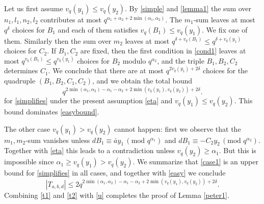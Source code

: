 \documentclass[11pt]{amsart}
\theoremstyle{plain}
\numberwithin{equation}{section}
\theoremstyle{definition}
\renewcommand{\geq}{\geqslant}
\renewcommand{\leq}{\leqslant}
\begin{document}
Let us first assume $v_q(y_1) \leq v_q(y_2)$. By \eqref{simple} and \eqref{lemma1} the sum over $n_1, l_1, n_2, l_2$ contributes at most $q^{\alpha_1 + \alpha_2 +  2 \min(\alpha_1, \alpha_2)}$. The $m_1$-sum leaves at most $q^{\delta}$ choices for $B_1$ and each of them satisfies $v_q(B_1) \leq v_q(y_1)$. We fix one of them.  Similarly then the sum over $m_2$ leaves at most $q^{\delta + v_q(B_1)} \leq q^{\delta + v_q(y_1)}$ choices for $C_2$. If $B_1, C_2$ are fixed, then the first condition in \eqref{cond1} leaves at most $q^{v_q(B_1)} \leq q^{v_q(y_1)}$  choices for $B_2$ modulo $q^{\alpha_2}$, and the triple $B_1, B_2, C_2$ determines $C_1$. We conclude that there are at most $q^{2v_q(y_1) + 2\delta}$ choices for the quadruple $(B_1, B_2,  C_1, C_2)$, and we obtain the total bound
\begin{equation}\label{case1}
  q^{2 \min(\alpha_1, \alpha_2) - \alpha_1- \alpha_2 + 2 \min(v_q(y_1), v_q(y_2)) + 2\delta} . 
\end{equation}
for \eqref{simplifies} under the present assumption \eqref{eta} and  $v_q(y_1) \leq v_q(y_2)$. This bound dominates \eqref{easybound}. 

The other case $v_q(y_1) > v_q(y_2)$ %
cannot happen: first we observe that the $m_1, m_2$-sum vanishes unless $dB_1 \equiv \bar{a}y_1 \, (\text{mod } q^{\alpha_1})$ and $dB_1 \equiv - C_2y_2 \, (\text{mod } q^{\alpha_2})$. Together with \eqref{eta} this leads to a contradiction unless $v_q(y_2) \geq \alpha_1$. But this is impossible since $ \alpha_1 \geq v_q(y_1) > v_q(y_2)$. 
We summarize that \eqref{case1} is an upper bound for \eqref{simplifies} in all cases, 
and together with \eqref{easy} we conclude
\begin{equation}\label{t2}
|T_{a, b, d}| \leq 2q^{2\min(\alpha_1, \alpha_2)- \alpha_1 - \alpha_2 +  2 \min(v_q(y_1), v_q(y_2) )+ 2\delta}.
\end{equation}
Combining \eqref{t1} and \eqref{t2} with \eqref{u} completes the proof of Lemma \ref{peter1}. 
\end{document}
